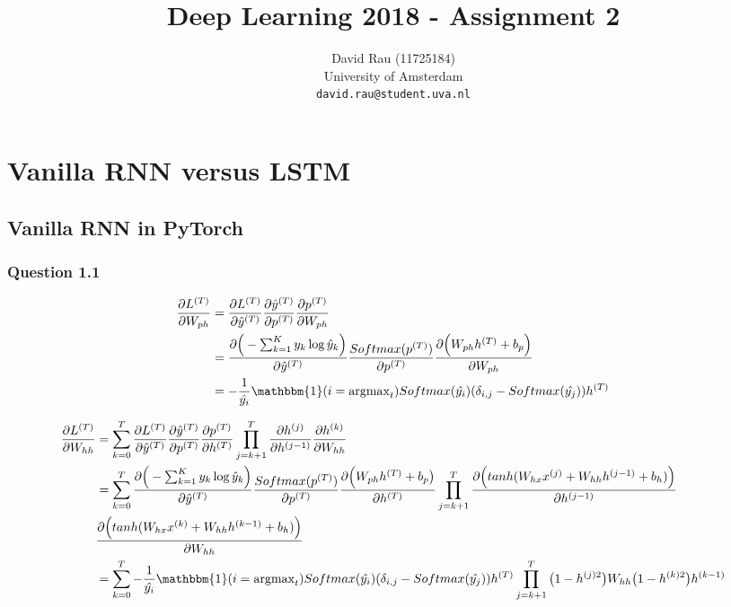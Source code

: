 \documentclass{article}
\title{Deep Learning 2018 - Assignment 2}
\author{
  David Rau (11725184) \\ 
  University of Amsterdam \\
  \texttt{david.rau@student.uva.nl} \\
}
\begin{document}

\maketitle


\section*{Vanilla RNN versus LSTM}
\subsection*{Vanilla RNN in PyTorch}
\subsubsection*{Question 1.1}
\begin{equation}
\begin{aligned}
	\frac{\partial L^{(T)}}{\partial W_{ph}} & = \frac{\partial L^{(T)}}{\partial \hat{y}^{(T)}}\frac{\partial \hat{y}^{(T)}}{\partial p^{(T)}}\frac{\partial p^{(T)}}{\partial W_{ph}} \\
	&= \frac{\partial \Big(-\sum_{k=1}^K y_k \log \hat{y}_k \Big)}{\partial \hat{y}^{(T)}} \frac{Softmax(p^{(T)})}{\partial p^{(T)}}\frac{\partial \Big(W_{ph} h^{(T)} + b_p \Big)}{\partial W_{ph}} \\
	& = -\frac{1}{\hat{y_i}}\mathbbm{1}(i=\operatorname{argmax}_t )  Softmax(\hat{y_i})(\delta_{i,j}-Softmax(\hat{y_j})) h^{(T)}
\end{aligned}
\end{equation}



\begin{equation}
\begin{aligned}
	\frac{\partial L^{(T)}}{\partial W_{hh}} & = \sum_{k=0}^T \frac{\partial L^{(T)}}{\partial \hat{y}^{(T)}}\frac{\partial \hat{y}^{(T)}}{\partial p^{(T)}}\frac{\partial p^{(T)}}{\partial h^{(T)}} \prod_{j=k+1}^{T} \frac{\partial h^{(j)}}{\partial h^{(j-1)}} \frac{\partial h^{(k)}}{\partial W_{hh}}\\
	& = \sum_{k=0}^T  \frac{\partial \Big(-\sum_{k=1}^K y_k \log \hat{y}_k \Big)}{\partial \hat{y}^{(T)}} \frac{Softmax(p^{(T)})}{\partial p^{(T)}}\frac{\partial \Big(W_{ph} h^{(T)} + b_p\big)}{\partial h^{(T)}} \prod_{j=k+1}^{T} \frac{\partial \Big(tanh(W_{hx}x^{(j)} + W_{hh} h^{(j-1)} + b_h) \Big)}{\partial h^{(j-1)}} \\
	& \frac{\partial \Big(tanh(W_{hx}x^{(k)} + W_{hh} h^{(k-1)} + b_h) \Big)}{\partial W_{hh}} \\
	& =\sum_{k=0}^T  -\frac{1}{\hat{y_i}}\mathbbm{1}(i=\operatorname{argmax}_t )  Softmax(\hat{y_i})(\delta_{i,j}-Softmax(\hat{y_j})) h^{(T)} \prod_{j=k+1}^{T} \big( 1-h^{(j)2} \big)  W_{hh} \big( 1- h^{(k)2} \big) h^{(k-1)} 
\end{aligned}
\end{equation}
\end{document}
